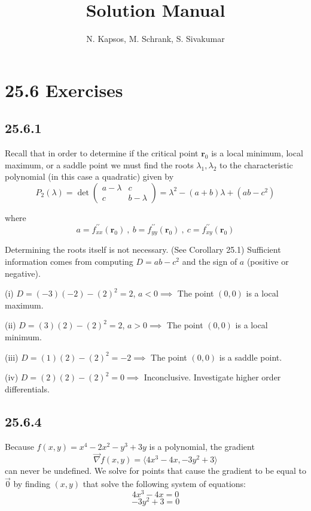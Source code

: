 \documentclass{article}
\title{Solution Manual}
\author{N. Kapsos, M. Schrank, S. Sivakumar}
\date{}
\begin{document}
\maketitle
\setcounter{secnumdepth}{0}

\section{25.6 Exercises}

\subsection{25.6.1}

Recall that in order to determine if the critical point $\mathbf{r}_0$ is a local minimum, local maximum, or a saddle point we must find the roots $\lambda_1, \lambda_2$ to the characteristic polynomial (in this case a quadratic) given by
$$P_2(\lambda) = \det\begin{pmatrix}
    a-\lambda & c \\
    c & b-\lambda
\end{pmatrix} = \lambda^2 - (a+b)\lambda + (ab-c^2)$$

where
$$a = f^{\prime \prime}_{xx}(\mathbf{r}_0)~,~ b = f^{\prime \prime}_{yy}(\mathbf{r}_0)~,~ c = f^{\prime \prime}_{xy}(\mathbf{r}_0)$$

Determining the roots itself is not necessary. (See Corollary 25.1) Sufficient information comes from computing $D=ab-c^2$ and the sign of $a$ (positive or negative).

\textsf{(i)} $D = (-3)(-2)-(2)^2 = 2$, $a < 0 \implies$ The point $(0,0)$ is a local maximum.

\textsf{(ii)} $D = (3)(2)-(2)^2 = 2$, $a > 0 \implies$ The point $(0,0)$ is a local minimum.

\textsf{(iii)} $D = (1)(2)-(2)^2 = -2 \implies$ The point $(0,0)$ is a saddle point.

\textsf{(iv)} $D = (2)(2)-(2)^2 = 0 \implies$ Inconclusive. Investigate higher order differentials.

\subsection{25.6.4}

Because $f(x,y) = x^4 - 2x^2 - y^3 + 3y$ is a polynomial, the gradient $$\vec{\nabla}f(x,y) = \langle 4x^3-4x, -3y^2+3 \rangle$$ can never be undefined. We solve for points that cause the gradient to be equal to $\vec{0}$ by finding $(x,y)$ that solve the following system of equations:
$$4x^3-4x = 0$$
$$-3y^2+3 = 0$$
\end{document}
